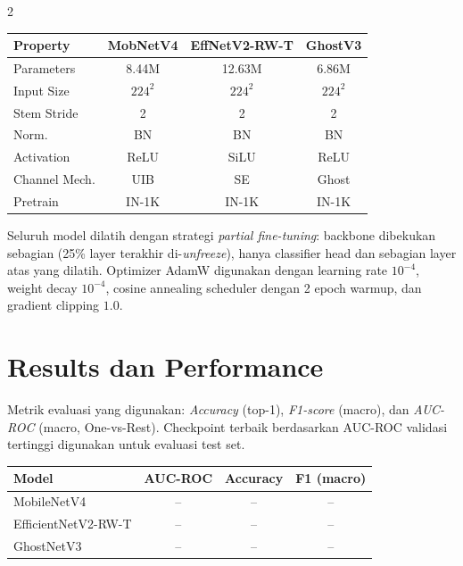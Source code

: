 \documentclass[10pt]{article}
\begin{document}
\begin{multicols}{2}
\begin{center}
\small
\begin{tabular}{lccc}
\toprule
\textbf{Property} & \textbf{MobNetV4} & \textbf{EffNetV2-RW-T} & \textbf{GhostV3} \\
\midrule
Parameters     & 8.44M   & 12.63M  & 6.86M  \\
Input Size     & $224^2$ & $224^2$ & $224^2$ \\
Stem Stride    & 2       & 2       & 2      \\
Norm.          & BN      & BN      & BN     \\
Activation     & ReLU    & SiLU    & ReLU   \\
Channel Mech.  & UIB     & SE      & Ghost  \\
Pretrain       & IN-1K   & IN-1K   & IN-1K  \\
\bottomrule
\end{tabular}
\end{center}

Seluruh model dilatih dengan strategi \textit{partial fine-tuning}: backbone dibekukan sebagian (25\% layer terakhir di-\textit{unfreeze}), hanya classifier head dan sebagian layer atas yang dilatih. Optimizer AdamW digunakan dengan learning rate $10^{-4}$, weight decay $10^{-4}$, cosine annealing scheduler dengan 2 epoch warmup, dan gradient clipping $1.0$.

\section{Results dan Performance}

Metrik evaluasi yang digunakan: \textit{Accuracy} (top-1), \textit{F1-score} (macro), dan \textit{AUC-ROC} (macro, One-vs-Rest). Checkpoint terbaik berdasarkan AUC-ROC validasi tertinggi digunakan untuk evaluasi test set.

\begin{center}
\small
\begin{tabular}{lccc}
\toprule
\textbf{Model} & \textbf{AUC-ROC} & \textbf{Accuracy} & \textbf{F1 (macro)} \\
\midrule
MobileNetV4    & -- & -- & -- \\
EfficientNetV2-RW-T & -- & -- & -- \\
GhostNetV3     & -- & -- & -- \\
\bottomrule
\end{tabular}
\end{center}


\end{multicols}
\end{document}
